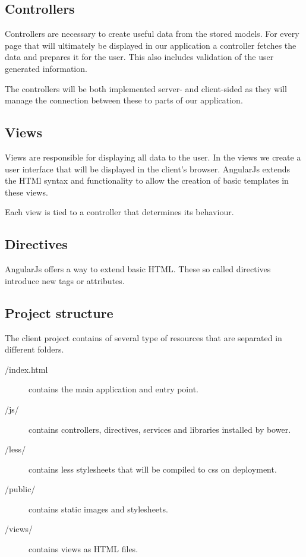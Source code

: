 \subsection{Controllers}\label{controllers}

Controllers are necessary to create useful data from the stored models.
For every page that will ultimately be displayed in our application a
controller fetches the data and prepares it for the user. This also
includes validation of the user generated information.

The controllers will be both implemented server- and client-sided as
they will manage the connection between these to parts of our
application.

\subsection{Views}\label{views}

Views are responsible for displaying all data to the user. In the views
we create a user interface that will be displayed in the client's
browser. AngularJs extends the HTMl syntax and functionality to allow
the creation of basic templates in these views.

Each view is tied to a controller that determines its behaviour.

\subsection{Directives}\label{directives}

AngularJs offers a way to extend basic HTML. These so called directives
introduce new tags or attributes.

\subsection{Project structure}\label{project-structure}

The client project contains of several type of resources that are
separated in different folders.

\begin{description}
\item[/index.html] contains the main application and entry point.
\item[/js/] contains controllers, directives, services and libraries installed by bower.
\item[/less/] contains less stylesheets that will be compiled to css on deployment.
\item[/public/] contains static images and stylesheets.
\item[/views/] contains views as HTML files.
\end{description}

